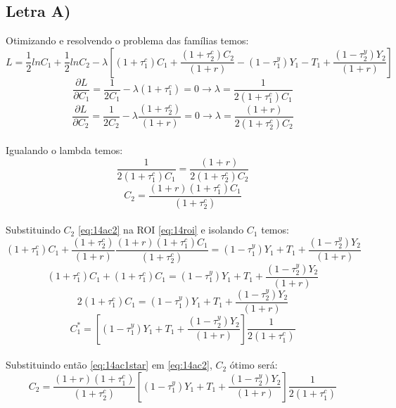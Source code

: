\documentclass{article}
\begin{document}
\subsection*{Letra A)}
Otimizando e resolvendo o problema das famílias temos:
\begin{equation}
    L = \frac{1}{2}ln C_1 + \frac{1}{2}ln C_2 - \lambda \left[(1+\tau_1^c)C_1 + \frac{(1+\tau_2^c)C_2}{(1+r)} - (1-\tau_1^y)Y_1 - T_1 + \frac{(1-\tau_2^y)Y_2}{(1+r)} \right]
\end{equation}
\begin{equation}
    \frac{\partial L}{\partial C_1} = \frac{1}{2C_1} - \lambda(1+\tau_1^c) = 0 \to \lambda = \frac{1}{2(1+\tau_1^c)C_1}
\end{equation}
\begin{equation}
    \frac{\partial L}{\partial C_2} = \frac{1}{2C_2} - \lambda \frac{(1+\tau_2^c)}{(1+r)} = 0 \to \lambda = \frac{(1+r)}{2(1+\tau_2^c)C_2}
\end{equation}
\\
Igualando o lambda temos:
\begin{equation}
    \frac{1}{2(1+\tau_1^c)C_1} = \frac{(1+r)}{2(1+\tau_2^c)C_2}
\end{equation}
\begin{equation}\label{eq:14ac2}
    C_2 = \frac{(1+r)(1+\tau_1^c)C_1}{(1+\tau_2^c)}
\end{equation}
\\
Substituindo $C_2$ \eqref{eq:14ac2} na ROI \eqref{eq:14roi} e isolando $C_1$ temos:
\begin{equation}
    (1+\tau_1^c)C_1 + \frac{(1+\tau_2^c)}{(1+r)}\frac{(1+r)(1+\tau_1^c)C_1}{(1+\tau_2^c)} = (1-\tau_1^y)Y_1 + T_1 + \frac{(1-\tau_2^y)Y_2}{(1+r)}
\end{equation}
\begin{equation}
    (1+\tau_1^c)C_1 + (1+\tau_1^c)C_1 = (1-\tau_1^y)Y_1 + T_1 + \frac{(1-\tau_2^y)Y_2}{(1+r)}
\end{equation}
\begin{equation}
    2(1+\tau_1^c)C_1 = (1-\tau_1^y)Y_1 + T_1 + \frac{(1-\tau_2^y)Y_2}{(1+r)}
\end{equation}
\begin{equation}\label{eq:14ac1star}
    C_1^* = \left[(1-\tau_1^y)Y_1 + T_1 + \frac{(1-\tau_2^y)Y_2}{(1+r)}\right]\frac{1}{2(1+\tau_1^c)}
\end{equation}
\\
Substituindo então \eqref{eq:14ac1star} em \eqref{eq:14ac2}, $C_2$ ótimo será:
\begin{equation}
    C_2 = \frac{(1+r)(1+\tau_1^c)}{(1+\tau_2^c)}\left[(1-\tau_1^y)Y_1 + T_1 + \frac{(1-\tau_2^y)Y_2}{(1+r)}\right]\frac{1}{2(1+\tau_1^c)}
\end{equation}
\end{document}
